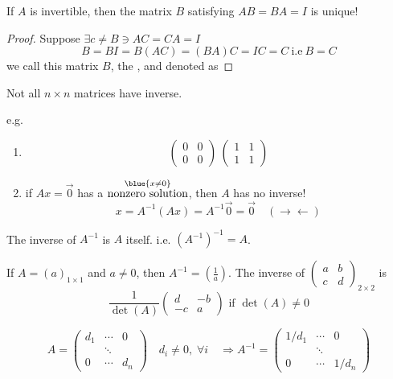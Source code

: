 \begin{theorem}
    If $A$ is invertible, then the matrix $B$ satisfying $AB = BA = I$ is unique!
\end{theorem}
\begin{proof}
    Suppose $\exists c \neq B \ni AC = CA = I$
    \[
    B = BI = B(AC) = (BA)C = IC = C \ \text{i.e} \ B = C
    \]
    we call this matrix $B$, the , and denoted as 
\end{proof}

\begin{note}
Not all $n\times n$ matrices have inverse.

e.g. 
\begin{enumerate}[$\arabic*^\circ$]
    \item \[
    \begin{pmatrix}
        0 & 0 \\
        0 & 0
    \end{pmatrix} \ \begin{pmatrix}
        1 & 1 \\
        1 & 1
    \end{pmatrix}
    \]
   
    \item if $Ax = \vec{0}$ has a \uline{$\overset{\blue{x\neq 0}}{\text{nonzero solution}}$}, then $A$ has no inverse!
    \[
    x = A^{-1}(Ax) = A^{-1}\vec{0} = \vec{0} \quad (\rightarrow\leftarrow)
    \]
\end{enumerate}
\end{note}

\begin{note}
The inverse of $A^{-1}$ is $A$ itself. i.e. $(A^{-1})^{-1} = A$.
\end{note}

\begin{note}
If $A = (a)_{1\times 1}$ and $a \neq 0$, then $A^{-1} = (\frac{1}{a})$.
The inverse of \(\begin{pmatrix}
    a & b \\
    c & d
\end{pmatrix}_{2\times2}\) is $$\frac{1}{\det(A)} \begin{pmatrix}
    d & -b \\
    -c & a
\end{pmatrix} \text{ if } \det(A) \neq 0$$
\end{note}

\begin{note}
\[
A = \begin{pmatrix}
    d_1 & \cdots & 0 \\
     & \ddots & \\
    0 & \cdots & d_n
\end{pmatrix} \quad d_i \neq 0, \; \forall i \quad \Longrightarrow A^{-1} = \begin{pmatrix}
    1/d_1 & \cdots & 0 \\
     & \ddots & \\
    0 & \cdots & 1/d_n
\end{pmatrix}
\]
\end{note}

